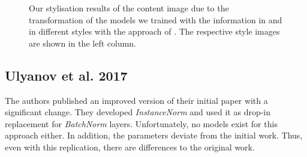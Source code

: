 \begin{figure}[H]
	\hfill%
	\begin{minipage}[t]{0.24\textwidth}
		\centering
		\paper{}
	\end{minipage}
	\hfill%
	\begin{minipage}[t]{0.24\textwidth}
		\centering
		\implementation{}
	\end{minipage}
	\caption{Our stylisation results of the content image due to the transformation of the models we trained with the information in \paper{} and \implementation{} in different styles with the approach of  \cite{ULVL2016}. The respective style images are shown in the left column.}
	\label{fig:ulyanov_et_al_2016_results}
\end{figure}

\subsection{Ulyanov et al. 2017}
The authors published an improved version of their initial paper \cite{ULVL2016} with a significant change. They developed \emph{InstanceNorm} and used it as drop-in replacement for \emph{BatchNorm} layers. Unfortunately, no models exist for this approach either. In addition, the parameters deviate from the initial work. Thus, even with this replication, there are differences to the original work.

